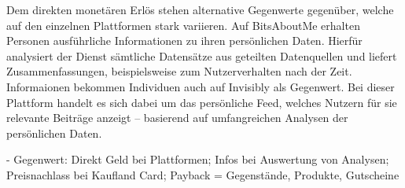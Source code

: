 \noindent Dem direkten monetären Erlös stehen alternative Gegenwerte gegenüber, welche auf den einzelnen Plattformen stark variieren. Auf BitsAboutMe erhalten Personen ausführliche Informationen zu ihren persönlichen Daten. Hierfür analysiert der Dienst sämtliche Datensätze aus geteilten Datenquellen und liefert Zusammenfassungen, beispielsweise zum Nutzerverhalten nach der Zeit. Informaionen bekommen Individuen auch auf Invisibly als Gegenwert. Bei dieser Plattform handelt es sich dabei um das persönliche Feed, welches Nutzern für sie relevante Beiträge anzeigt -- basierend auf umfangreichen Analysen der persönlichen Daten. \newline

- Gegenwert: Direkt Geld bei Plattformen; Infos bei Auswertung von Analysen; Preisnachlass bei Kaufland Card; Payback = Gegenstände, Produkte, Gutscheine

